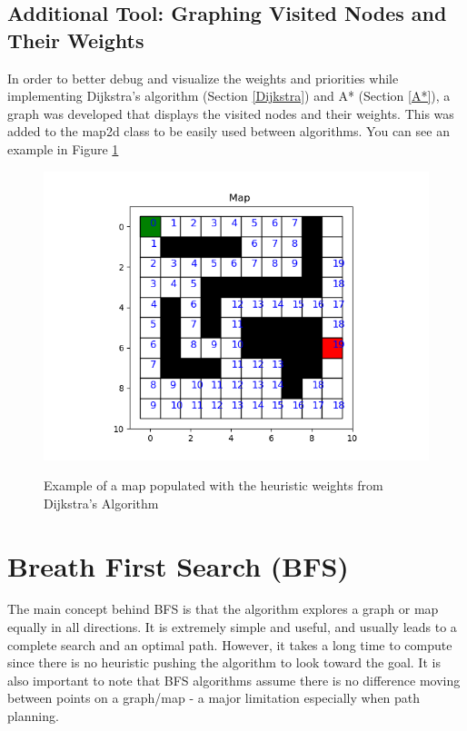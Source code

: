 \documentclass[journal]{IEEEtran}
\begin{document}
    \subsection{Additional Tool: Graphing Visited Nodes and Their Weights}
    In order to better debug and visualize the weights and priorities while implementing Dijkstra's algorithm (Section \ref{Dijkstra}) and A* (Section \ref{A*}), a graph was developed that displays the visited nodes and their weights. This was added to the map2d class to be easily used between algorithms. You can see an example in Figure \ref{fig:Dijkstra_Weights_Example}

    \begin{figure}[ht]
        \includegraphics[width=\linewidth]{figures/Dijkstra_Weights.png}
        \label{fig:Dijkstra_Weights_Example}
        \caption{Example of a map populated with the heuristic weights from Dijkstra's Algorithm}
    \end{figure} 

    \section{Breath First Search (BFS)} \label{BFS}
    The main concept behind BFS is that the algorithm explores a graph or map equally in all directions. It is extremely simple and useful, and usually leads to a complete search and an optimal path. However, it takes a long time to compute since there is no heuristic pushing the algorithm to look toward the goal. It is also important to note that BFS algorithms assume there is no difference moving between points on a graph/map - a major limitation especially when path planning.
\end{document}
